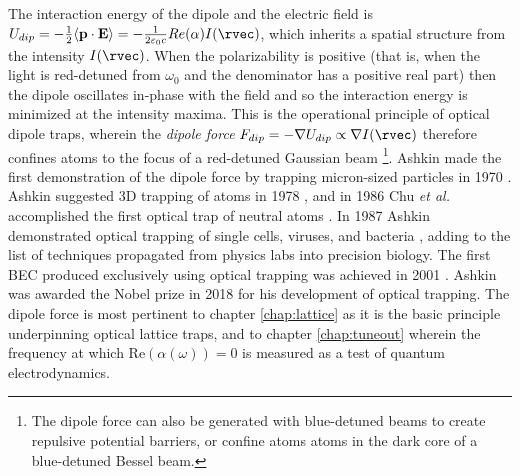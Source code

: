 	The interaction energy of the dipole and the electric field is $U_{dip} = -\frac{1}{2}\langle\textbf{p}\cdot\textbf{E}\rangle = -\frac{1}{2\varepsilon_0 c}Re(\alpha)I(\rvec)$, which inherits a spatial structure from the intensity $I(\rvec)$.
	When the polarizability is positive (that is, when the light is red-detuned from $\omega_0$ and the denominator has a positive real part) then the dipole oscillates in-phase with the field and so the interaction energy is minimized at the intensity maxima.
	This is the operational principle of optical dipole traps, wherein the \emph{dipole force} $F_{dip} = -\nabla U_{dip} \propto \nabla I(\rvec)$ therefore confines atoms to the focus of a red-detuned Gaussian beam \footnote{The dipole force can also be generated with blue-detuned beams to create repulsive potential barriers, or confine atoms atoms in the dark core of a blue-detuned Bessel beam.}.
	Ashkin made the first demonstration of the dipole force by trapping micron-sized particles in 1970 \cite{Ashkin70}.
	Ashkin suggested 3D trapping of atoms in 1978 \cite{Ashkin78}, and in 1986 Chu \emph{et al.} accomplished the first optical trap of neutral atoms \cite{Chu86}. 
	In 1987 Ashkin demonstrated optical trapping of single cells, viruses, and bacteria \cite{Ashkin87cell, Ashkin87virus}, adding to the list of techniques propagated from physics labs into precision biology.
	The first BEC produced exclusively using optical trapping was achieved in 2001 \cite{Barrett01}.
	Ashkin was awarded the Nobel prize in 2018 for his development of optical trapping.
	The dipole force is most pertinent to chapter \ref{chap:lattice} as it is the basic principle underpinning optical lattice traps, and to chapter \ref{chap:tuneout} wherein the frequency at which Re$(\alpha(\omega))=0$ is measured as a test of quantum electrodynamics.
	


